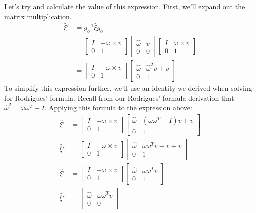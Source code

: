 \documentclass[oneside]{book}
\begin{document}
Let's try and calculate the value of this expression. First, we'll expand out the matrix multiplication.
\begin{align}
    \hat\xi' &= g_o^{-1} \hat\xi g_o\\
    &= 
    \begin{bmatrix}
    I & -\omega\times v\\
    0 & 1
    \end{bmatrix}
    \begin{bmatrix}
    \hat\omega & v\\
    0 & 0
    \end{bmatrix}
    \begin{bmatrix}
    I & \omega\times v\\
    0 & 1
    \end{bmatrix}\\
    &= 
    \begin{bmatrix}
    I & -\omega\times v\\
    0 & 1
    \end{bmatrix}
    \begin{bmatrix}
    \hat\omega & \hat\omega^2v + v\\
    0 & 1
    \end{bmatrix}
\end{align}
To simplify this expression further, we'll use an identity we derived when solving for Rodrigues' formula. Recall from our Rodrigues' formula derivation that $\hat\omega^2 = \omega\omega^T - I$. Applying this formula to the expression above:
\begin{align}
    \hat\xi'
    &= 
    \begin{bmatrix}
    I & -\omega\times v\\
    0 & 1
    \end{bmatrix}
    \begin{bmatrix}
    \hat\omega & (\omega\omega^T - I)v + v\\
    0 & 1
    \end{bmatrix}\\
    \hat\xi'&=
    \begin{bmatrix}
    I & -\omega\times v\\
    0 & 1
    \end{bmatrix}
    \begin{bmatrix}
    \hat\omega & \omega\omega^Tv - v + v\\
    0 & 1
    \end{bmatrix}\\
    \hat\xi'&=
    \begin{bmatrix}
    I & -\omega\times v\\
    0 & 1
    \end{bmatrix}
    \begin{bmatrix}
    \hat\omega & \omega\omega^Tv\\
    0 & 1
    \end{bmatrix}\\
    \hat\xi'&=
    \begin{bmatrix}
    \hat\omega & \omega\omega^Tv\\
    0 & 0
    \end{bmatrix}
\end{align}
\end{document}
